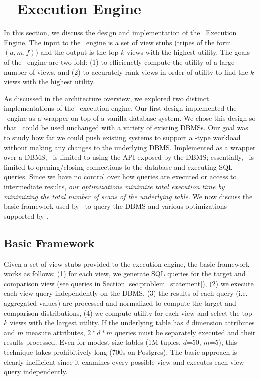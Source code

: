 
\section{{\large \VizRecDB\ } Execution Engine}
In this section, we discuss the design and implementation of the \VizRecDB\
Execution Engine. 
The input to the \VizRecDB\ engine is a set of view stubs (tripes of the form
$(a, m, f)$) and the output is the top-$k$ views with the highest utility.
The goals of the \VizRecDB\ engine are two fold:
(1) to efficienctly compute the utility of a large number of views, and (2) to accurately rank views in order of
utility to find the $k$ views with the highest utility.


As discussed in the architecture overview, we explored two distinct
implementations of the \VizRecDB\ execution engine.
Our first design implemented the \VizRecDB\ engine as a wrapper on top of a
vanilla database system.
We chose this design so that \VizRecDB\ could be used unchanged with a variety of
existing DBMSs.
Our goal was to study how far we could push existing systems to
support a \VizRecDB-type workload without making any changes to the underlying
DBMS.
Implemented as a wrapper over a DBMS, \VizRecDB\ is limited to using the API
exposed by the DBMS; essentially, \VizRecDB\ is limited to opening/closing connections to the
database and executing SQL queries. 
Since we have no control over how queries are executed or access to intermediate
results, {\it our optimizations minimize total execution time by minimizing the
total number of scans of the underlying table}.
We now discuss the basic framework used by \VizRecDB\ to query the DBMS and various
optimizations supported by \VizRecDB.

\subsection{Basic Framework}
\label{sec:basic_framework}
Given a set of view stubs provided to the execution engine, the basic framework
works as follows: 
(1) for each view, we generate SQL queries for the target and
comparison view (see queries in Section \ref{sec:problem_statement}), 
(2) we execute each view query independently on the DBMS, 
(3) the results of each query (i.e. aggregated values) are processed and
normalized to compute the target and comparison distributions, 
(4) we compute utility for each view and select the top-$k$ views with the largest utility.
If the underlying table has $d$ dimension attributes and $m$ measure attributes,
$2\ast d \ast m$ queries must be separately executed and their results
processed. Even for modest size tables (1M tuples, $d$=50, $m$=5), this
technique takes prohibitively long (700s on Postgres). The basic approach is
clearly inefficient since it examines every possible view and executes each view
query independently.

